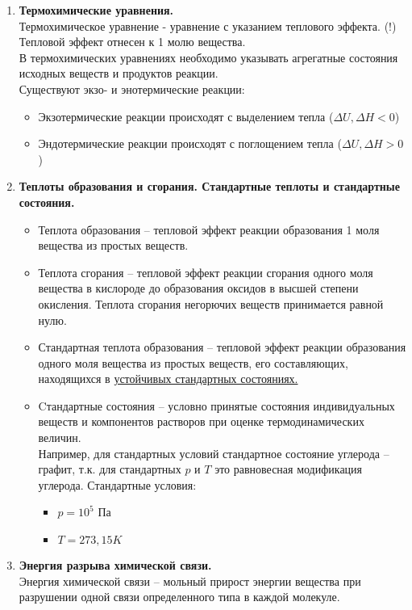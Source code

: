 \documentclass[14pt,a4paper]{scrartcl}
\begin{document}
\begin{enumerate}[label=\arabic*)]
		\item \textbf{Термохимические уравнения.}\\
		Термохимическое уравнение - уравнение с указанием теплового эффекта. (!) Тепловой эффект отнесен к 1 молю вещества.\\
		В термохимических уравнениях необходимо указывать агрегатные состояния исходных веществ и продуктов реакции. \\
		Существуют экзо- и энотермические реакции:
		\begin{itemize}
			\item Экзотермические реакции происходят с выделением тепла ($\Delta{U}, \Delta{H} < 0$)
			\item Эндотермические реакции происходят с поглощением тепла ($\Delta{U}, \Delta{H} > 0$)
		\end{itemize}
		\item \textbf{Теплоты образования и сгорания. Стандартные теплоты и стандартные состояния.}
		\begin{itemize}
			\item Теплота образования -- тепловой эффект реакции образования 1 моля вещества из простых веществ.
			\item Теплота сгорания -- тепловой эффект реакции сгорания одного моля вещества в кислороде до образования оксидов в высшей степени окисления. Теплота сгорания негорючих веществ принимается равной нулю.
			\item Стандартная теплота образования -- тепловой эффект реакции образования одного моля вещества из простых веществ, его составляющих, находящихся в \underline{устойчивых стандартных состояниях.}
			\item Cтандартные состояния -- условно принятые состояния индивидуальных веществ и компонентов растворов при оценке термодинамических величин. \\ 
			Например, для стандартных условий стандартное состояние углерода -- графит, т.к. для стандартных $p$ и $T$ это равновесная модификация углерода.
			Стандартные условия:
			\begin{itemize}
				\item $p = 10^5$ Па
				\item $T = 273,15 K$
			\end{itemize}
		\end{itemize}
		\item \textbf{Энергия разрыва химической связи.}\\
		Энергия химической связи -- мольный прирост энергии вещества при разрушении одной связи определенного типа в каждой молекуле.			
	\end{enumerate}
\end{document}
